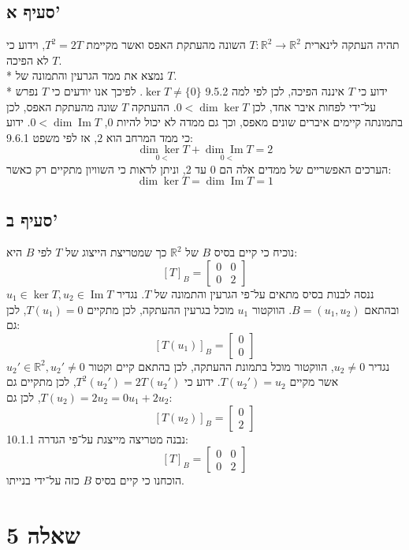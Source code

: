 \documentclass[a4paper,10pt]{article}
\DeclareMathOperator\im{Im}
\begin{document}
\begin{hebrew}
	\subsection{סעיף א'}
	תהיה העתקה לינארית $T: \mathbb{R}^2 \to \mathbb{R}^2$
	השונה מהעתקת האפס ואשר מקיימת $T^2 = 2T$, וידוע כי $T$ לא הפיכה. \\*
	נמצא את ממד הגרעין והתמונה של $T$. \\*
	ידוע כי $T$ איננה הפיכה, לכן לפי למה 9.5.2 $\ker T \ne \{0\}$.
	לפיכך אנו יודעים כי $T$ נפרש על־ידי לפחות איבר אחד, לכן $0 < \dim \ker T$.
	ההעתקה $T$ שונה מהעתקת האפס, לכן בתמונתה קיימים איברים שונים מאפס,
	וכך גם ממדה לא יכול להיות 0, $0 < \dim \im T$.
	ידוע כי ממד המרחב הוא $2$, אז לפי משפט 9.6.1:
	\[
		\underset{0 < }{\dim \ker T} + \underset{0 <}{\dim \im T} = 2
	\]
	הערכים האפשריים של ממדים אלה הם 0 עד 2,
	וניתן לראות כי השוויון מתקיים רק כאשר:
	\[
		\dim \ker T = \dim \im T = 1
	\]

	\subsection{סעיף ב'}
	נוכיח כי קיים בסיס $B$ של $\mathbb{R}^2$
	כך שמטריצת הייצוג של $T$ לפי $B$ היא:
	\[
		{[T]}_B =
		\begin{bmatrix}
			0 & 0 \\
			0 & 2
		\end{bmatrix}
	\]
	ננסה לבנות בסיס מתאים על־פי הגרעין והתמונה של $T$.
	נגדיר $u_1 \in \ker T, u_2 \in \im T$ ובהתאם $B = (u_1, u_2)$.
	הווקטור $u_1$ מוכל בגרעין ההעתקה, לכן מתקיים $T(u_1) = 0$,
	לכן גם:
	\[
		{[T(u_1)]}_B = \begin{bmatrix} 0 \\ 0 \end{bmatrix}
	\]
	נגדיר $u_2 \ne 0$, הווקטור מוכל בתמונת ההעתקה,
	לכן בהתאם קיים וקטור $u_2' \in \mathbb{R}^2, u_2' \ne 0$
	אשר מקיים $T(u_2') = u_2$. ידוע כי $T^2(u_2') = 2T(u_2')$,
	לכן מתקיים גם $T(u_2) = 2u_2 = 0u_1 + 2u_2$, לכן גם:
	\[
		{[T(u_2)]}_B = \begin{bmatrix} 0 \\ 2 \end{bmatrix}
	\]
	נבנה מטריצה מייצגת על־פי הגדרה 10.1.1:
	\[
		{[T]}_B =
		\begin{bmatrix}
			0 & 0 \\
			0 & 2
		\end{bmatrix}
	\]
	הוכחנו כי קיים בסיס $B$ כזה על־ידי בנייתו.

	\section{שאלה 5}

\end{hebrew}
\end{document}
